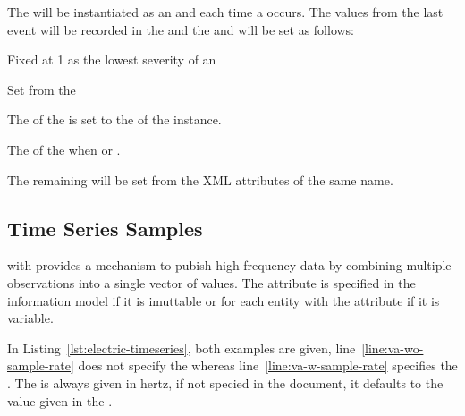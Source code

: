 The  will be instantiated as an  and each time a  occurs. The values from the last event will be recorded in the  and the   and  will be set as follows: 

\begin{description}[font=\it\bfseries,labelindent=4em,labelwidth=6em,leftmargin=!]    
  \item[Severity] Fixed at 1 as the lowest severity of an 
  \item[Message] Set from the 
  \item[Time] 
  \item[NodeId] The  of the  is set to the  of the   instance.
  \item[Message] The  of the  when  or .
  \item[\ldots] The remaining  will be set from the XML attributes of the same name.
\end{description}

\subsection{Time Series Samples}

 with   provides a mechanism to pubish high frequency data by combining multiple observations into a single vector of values. The attribute  is specified in the  information model if it is imuttable or for each entity with the attribute  if it is variable. 

In Listing~\ref{lst:electric-timeseries}, both examples are given, line~\ref{line:va-wo-sample-rate} does not specify the  whereas line~\ref{line:va-w-sample-rate} specifies the . The  is always given in hertz, if not specied in the  document, it defaults to the value given in the .


